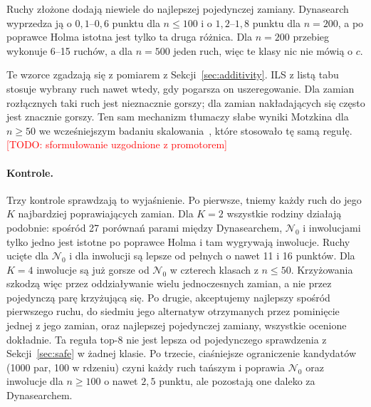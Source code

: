 \documentclass[10pt,twocolumn]{article}
\newcommand{\todo}[1]{\textcolor{red}{[TODO: #1]}}
\newcommand{\N}{\mathcal{N}}
\begin{document}
Ruchy złożone dodają niewiele do najlepszej pojedynczej zamiany.
Dynasearch wyprzedza ją o $0{,}1$--$0{,}6$ punktu dla $n\leq100$ i o
$1{,}2$--$1{,}8$ punktu dla $n=200$, a po poprawce Holma istotna jest
tylko ta druga różnica. Dla $n=200$ przebieg wykonuje 6--15 ruchów,
a dla $n=500$ jeden ruch, więc te klasy nic nie mówią o $c$.

Te wzorce zgadzają się z pomiarem z Sekcji~\ref{sec:additivity}. ILS
z listą tabu stosuje wybrany ruch nawet wtedy, gdy pogarsza on
uszeregowanie. Dla zamian rozłącznych taki ruch jest nieznacznie gorszy;
dla zamian nakładających się często jest znacznie gorszy. Ten sam
mechanizm tłumaczy słabe wyniki Motzkina dla $n\geq50$ we wcześniejszym
badaniu skalowania~\cite{windowed_own}, które stosowało tę samą regułę.
\todo{sformułowanie uzgodnione z promotorem}

\paragraph{Kontrole.} Trzy kontrole sprawdzają to wyjaśnienie. Po
pierwsze, tniemy każdy ruch do jego $K$ najbardziej poprawiających zamian.
Dla $K=2$ wszystkie rodziny działają podobnie: spośród 27 porównań
parami między Dynasearchem, $\N_0$ i inwolucjami tylko jedno jest istotne
po poprawce Holma i tam wygrywają inwolucje. Ruchy ucięte dla $\N_0$
i dla inwolucji są lepsze od pełnych o nawet 11 i 16 punktów. Dla $K=4$
inwolucje są już gorsze od $\N_0$ w czterech klasach z $n\leq50$.
Krzyżowania szkodzą więc przez oddziaływanie wielu jednoczesnych zamian,
a nie przez pojedynczą parę krzyżującą się. Po drugie, akceptujemy
najlepszy spośród pierwszego ruchu, do siedmiu jego alternatyw
otrzymanych przez pominięcie jednej z jego zamian, oraz najlepszej
pojedynczej zamiany, wszystkie ocenione dokładnie. Ta reguła top-8 nie
jest lepsza od pojedynczego sprawdzenia z Sekcji~\ref{sec:safe} w żadnej
klasie. Po trzecie, ciaśniejsze ograniczenie kandydatów (1000 par, 100
w rdzeniu) czyni każdy ruch tańszym i poprawia $\N_0$ oraz inwolucje dla
$n\geq100$ o nawet $2{,}5$ punktu, ale pozostają one daleko za
Dynasearchem.
\end{document}
